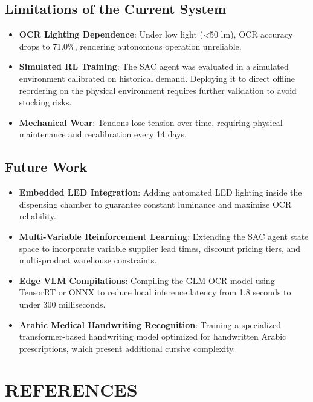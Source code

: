 \documentclass[12pt,a4paper,oneside]{report}
\begin{document}
\section{Limitations of the Current
System}\label{limitations-of-the-current-system}

\begin{itemize}
\item
  \textbf{OCR Lighting Dependence}: Under low light
  (\emph{\textless{}}50 lm), OCR accuracy drops to 71.0\%, rendering
  autonomous operation unreliable.
\item
  \textbf{Simulated RL Training}: The SAC agent was evaluated in a
  simulated environment calibrated on historical demand. Deploying it to
  direct offline reordering on the physical environment requires further
  validation to avoid stocking risks.
\item
  \textbf{Mechanical Wear}: Tendons lose tension over time, requiring
  physical maintenance and recalibration every 14 days.
\end{itemize}

\section{Future Work}\label{future-work}

\begin{itemize}
\item
  \textbf{Embedded LED Integration}: Adding automated LED lighting
  inside the dispensing chamber to guarantee constant luminance and
  maximize OCR reliability.
\item
  \textbf{Multi-Variable Reinforcement Learning}: Extending the SAC
  agent state space to incorporate variable supplier lead times,
  discount pricing tiers, and multi-product warehouse constraints.
\item
  \textbf{Edge VLM Compilations}: Compiling the GLM-OCR model using
  TensorRT or ONNX to reduce local inference latency from 1.8 seconds to
  under 300 milliseconds.
\item
  \textbf{Arabic Medical Handwriting Recognition}: Training a
  specialized transformer-based handwriting model optimized for
  handwritten Arabic prescriptions, which present additional cursive
  complexity.
\end{itemize}

\chapter*{REFERENCES}\label{references}
\end{document}
